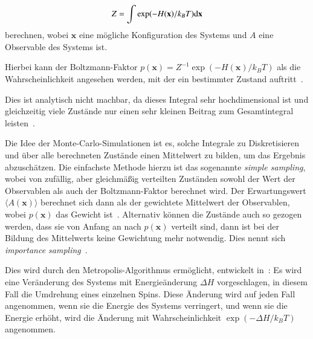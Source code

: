 	\[
	Z=\int \exp(-H(\mathbf{x})/k_BT) \text{d} \mathbf{x}
	\]
	berechnen, wobei $\mathbf{x}$ eine mögliche Konfiguration des Systems und $A$ eine Observable des Systems ist.
	
	
	Hierbei kann der Boltzmann-Faktor $p(\mathbf{x})=Z^{-1} \exp(-H(\mathbf{x})/k_BT)$ als die Wahrscheinlichkeit angesehen werden, mit der ein bestimmter Zustand auftritt~\cite[vgl. ][S. 8 f.]{binderheermann}.
	
	Dies ist analytisch nicht machbar, da dieses Integral sehr hochdimensional ist und gleichzeitig viele Zustände nur einen sehr kleinen Beitrag zum Gesamtintegral leisten~\cite[vgl. ][S. 9]{binderheermann}.
	
	Die Idee der Monte-Carlo-Simulationen ist es, solche Integrale zu Diskretisieren
	und über alle berechneten Zustände einen Mittelwert zu bilden, um das Ergebnis abzuschätzen. 
	Die einfachste Methode hierzu ist das sogenannte \textit{simple sampling}, wobei von zufällig, aber gleichmäßig verteilten Zuständen sowohl der Wert der Observablen als auch der Boltzmann-Faktor berechnet wird. Der Erwartungswert $\langle A(\mathbf{x}) \rangle$ berechnet sich dann als der gewichtete Mittelwert der Observablen, wobei $p(\mathbf{x})$ das Gewicht ist~\cite[vgl. ][S. 9 f.]{binderheermann}.
	 Alternativ können die Zustände auch so gezogen werden, dass sie von Anfang an nach $p(\mathbf{x})$ verteilt sind, dann ist bei der Bildung des Mittelwerts keine Gewichtung mehr notwendig. Dies nennt sich \textit{importance sampling}~\cite[vgl. ][S. 19 f.]{binderheermann}.
	
	Dies wird durch den Metropolis-Algorithmus ermöglicht, entwickelt in~\cite{metropolisupdate}:
	Es wird eine Veränderung des Systems mit Energieänderung $\Delta H$ vorgeschlagen, in diesem Fall die Umdrehung eines einzelnen Spins. Diese Änderung wird auf jeden Fall angenommen, wenn sie die Energie des Systems verringert, und wenn sie die Energie erhöht, wird die Änderung mit Wahrscheinlichkeit $\exp(-\Delta H/k_BT)$ angenommen.
	
